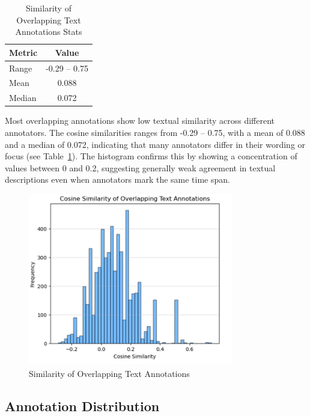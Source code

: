 \documentclass{article}
\begin{document}
\begin{table}[ht]
  \caption{Similarity of Overlapping Text Annotations Stats}
  \label{tab:text_similarity}
  \centering
  \begin{tabular}{lc}
    \toprule
    Metric & Value \\
    \midrule
    Range & -0.29 -- 0.75 \\
    Mean & 0.088 \\
    Median & 0.072 \\
    \bottomrule
  \end{tabular}
\end{table}

Most overlapping annotations show low textual similarity across different annotators. The cosine similarities ranges from -0.29 -- 0.75, with a mean of 0.088 and a median of 0.072, indicating that many annotators differ in their wording or focus (see Table~\ref{tab:text_similarity}). The histogram confirms this by showing a concentration of values between 0 and 0.2, suggesting generally weak agreement in textual descriptions even when annotators mark the same time span.

\begin{figure}[ht]
  \centering
  \includegraphics[width=0.8\textwidth]{figures/annotation_quality/similarity_of_overlapping_text_annotations.png}
  \caption{Similarity of Overlapping Text Annotations}
  \label{fig:text_similarity}
\end{figure}

\subsection{Annotation Distribution}
\end{document}
